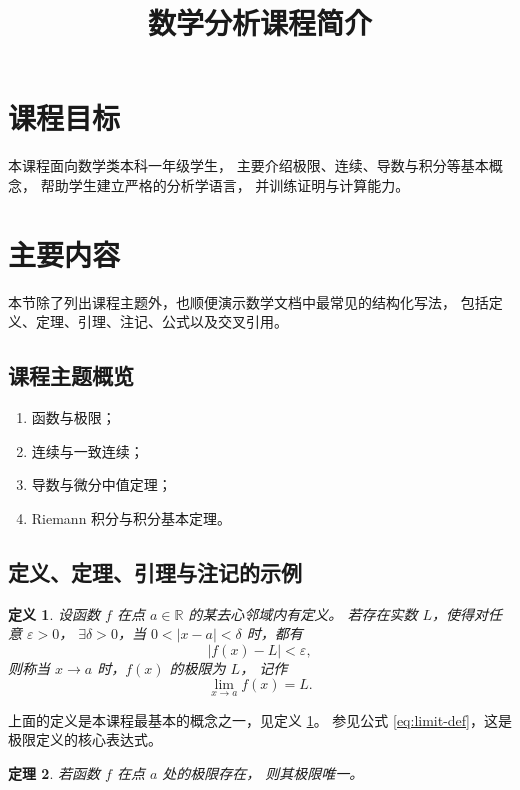 \documentclass[UTF8]{ctexart}
\title{数学分析课程简介}
\date{}
\newtheorem{theorem}{定理}[section]
\newtheorem{definition}[theorem]{定义}
\numberwithin{equation}{section}
\newcommand{\RR}{\mathbb{R}}
\begin{document}
\maketitle

\section{课程目标}

本课程面向数学类本科一年级学生，
主要介绍极限、连续、导数与积分等基本概念，
帮助学生建立严格的分析学语言，
并训练证明与计算能力。

\section{主要内容}

本节除了列出课程主题外，也顺便演示数学文档中最常见的结构化写法，
包括定义、定理、引理、注记、公式以及交叉引用。

\subsection{课程主题概览}

\begin{enumerate}
  \item 函数与极限；
  \item 连续与一致连续；
  \item 导数与微分中值定理；
  \item Riemann 积分与积分基本定理。
\end{enumerate}

\subsection{定义、定理、引理与注记的示例}

\begin{definition}\label{def:limit}
设函数 $f$ 在点 $a \in \RR$ 的某去心邻域内有定义。
若存在实数 $L$，使得对任意 $\varepsilon>0$，
$\exists \delta>0$，当 $0<|x-a|<\delta$ 时，都有
\begin{equation}
  \label{eq:limit-def}
|f(x)-L|<\varepsilon,
\end{equation}
则称当 $x \to a$ 时，$f(x)$ 的极限为 $L$，
记作
\[
\lim_{x \to a} f(x)=L.
\]
\end{definition}

上面的定义是本课程最基本的概念之一，见定义 \ref{def:limit}。
参见公式 \eqref{eq:limit-def}，这是极限定义的核心表达式。

\begin{theorem}\label{thm:unique-limit}
若函数 $f$ 在点 $a$ 处的极限存在，
则其极限唯一。
\end{theorem}
\end{document}
